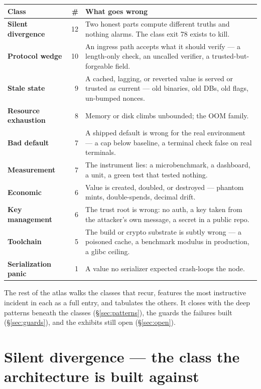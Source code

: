 \documentclass[10pt,a4paper]{article}
\begin{document}
\begin{center}
\small
{}
\renewcommand{\arraystretch}{1.35}
\begin{tabularx}{\textwidth}{@{}lr>{\RaggedRight\arraybackslash}X@{}}
\toprule
Class & \# & What goes wrong \\
\midrule
\textbf{Silent divergence} & 12 & Two honest parts compute different truths and nothing
alarms. The class exit 78 exists to kill. \\
\textbf{Protocol wedge} & 10 & An ingress path accepts what it should verify — a
length-only check, an uncalled verifier, a trusted-but-forgeable field. \\
\textbf{Stale state} & 9 & A cached, lagging, or reverted value is served or trusted as
current — old binaries, old DBs, old flags, un-bumped nonces. \\
\textbf{Resource exhaustion} & 8 & Memory or disk climbs unbounded; the OOM family. \\
\textbf{Bad default} & 7 & A shipped default is wrong for the real environment — a cap
below baseline, a terminal check false on real terminals. \\
\textbf{Measurement} & 7 & The instrument lies: a microbenchmark, a dashboard, a unit,
a green test that tested nothing. \\
\textbf{Economic} & 6 & Value is created, doubled, or destroyed — phantom mints,
double-spends, decimal drift. \\
\textbf{Key management} & 6 & The trust root is wrong: no auth, a key taken from the
attacker's own message, a secret in a public repo. \\
\textbf{Toolchain} & 5 & The build or crypto substrate is subtly wrong — a poisoned
cache, a benchmark modulus in production, a glibc ceiling. \\
\textbf{Serialization panic} & 1 & A value no serializer expected crash-loops the node. \\
\bottomrule
\end{tabularx}
\end{center}

The rest of the atlas walks the classes that recur, features the most instructive
incident in each as a full entry, and tabulates the others. It closes with the deep
patterns beneath the classes (\S\ref{sec:patterns}), the guards the failures built
(\S\ref{sec:guards}), and the exhibits still open (\S\ref{sec:open}).

\section{Silent divergence — the class the architecture is built against}\label{sec:divergence}
\end{document}

